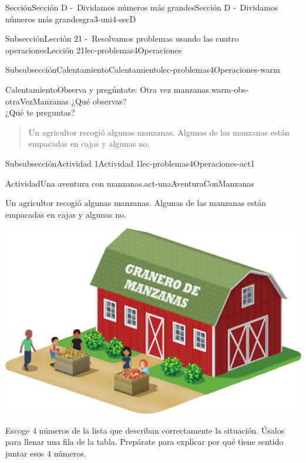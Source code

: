 \documentclass[twoside,10pt,]{article}
\begin{document}
\begin{sectionptx}{Sección}{Sección D -~Dividamos números más grandes}{}{Sección D -~Dividamos números más grandes}{}{}{gra3-uni4-secD}
\begin{subsectionptx}{Subsección}{Lección 21 -~Resolvamos problemas usando las cuatro operaciones}{}{Lección 21}{}{}{lec-problemas4Operaciones}
\begin{subsubsectionptx}{Subsubsección}{Calentamiento}{}{Calentamiento}{}{}{lec-problemas4Operaciones-warm}
\begin{exploration}{Calentamiento}{Observa y pregúntate: Otra vez manzanas.}{warm-obs-otraVezManzanas}%
¿Qué observas?\\
 ¿Qué te preguntas?%
\begin{quote}%
Un agricultor recogió algunas manzanas. Algunas de las manzanas están empacadas en cajas y algunas no.%
\end{quote}
\end{exploration}%
\end{subsubsectionptx}
%
%
\typeout{************************************************}
\typeout{************************************************}
%
\begin{subsubsectionptx}{Subsubsección}{Actividad 1}{}{Actividad 1}{}{}{lec-problemas4Operaciones-act1}
\begin{activity}{Actividad}{Una aventura con manzanas.}{act-unaAventuraConManzanas}%
\begin{sidebyside}{2}{0}{0}{0.1}%
\begin{sbspanel}{0.6}%
Un agricultor recogió algunas manzanas. Algunas de las manzanas están empacadas en cajas y algunas no.%
\end{sbspanel}%
\begin{sbspanel}{0.3}%
\includegraphics[width=\linewidth]{external/png-source/3.4.D21.S_Sp.png}
\end{sbspanel}%
\end{sidebyside}%
\par
Escoge \(4\) números de la lista que describan correctamente la situación. Úsalos para llenar una fila de la tabla. Prepárate para explicar por qué tiene sentido juntar esos \(4\) números.%
\begin{image}{0}{1}{0}{}%

\end{image}
\end{activity}
\end{subsubsectionptx}
\end{subsectionptx}
\end{sectionptx}
\end{document}
